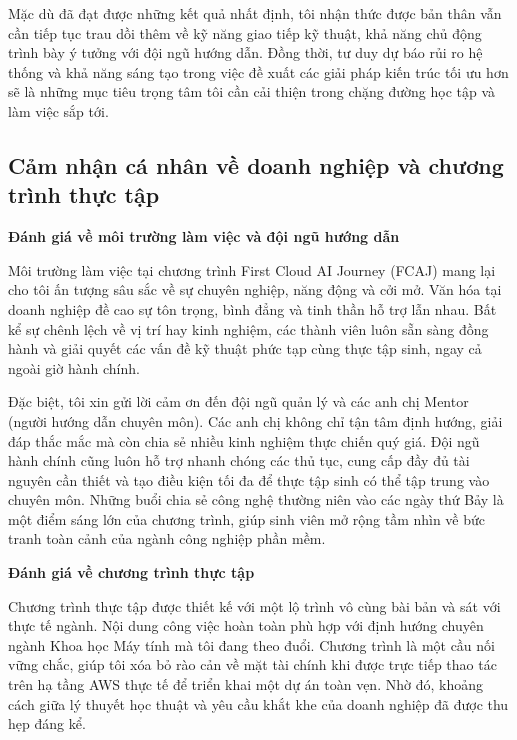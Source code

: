 Mặc dù đã đạt được những kết quả nhất định, tôi nhận thức được bản thân vẫn cần tiếp tục trau dồi thêm về kỹ năng giao tiếp kỹ thuật, khả năng chủ động trình bày ý tưởng với đội ngũ hướng dẫn. Đồng thời, tư duy dự báo rủi ro hệ thống và khả năng sáng tạo trong việc đề xuất các giải pháp kiến trúc tối ưu hơn sẽ là những mục tiêu trọng tâm tôi cần cải thiện trong chặng đường học tập và làm việc sắp tới.


\subsection{Cảm nhận cá nhân về doanh nghiệp và chương trình thực tập}

\vspace{0.2cm}
\noindent\textbf{Đánh giá về môi trường làm việc và đội ngũ hướng dẫn}

Môi trường làm việc tại chương trình First Cloud AI Journey (FCAJ) mang lại cho tôi ấn tượng sâu sắc về sự chuyên nghiệp, năng động và cởi mở. Văn hóa tại doanh nghiệp đề cao sự tôn trọng, bình đẳng và tinh thần hỗ trợ lẫn nhau. Bất kể sự chênh lệch về vị trí hay kinh nghiệm, các thành viên luôn sẵn sàng đồng hành và giải quyết các vấn đề kỹ thuật phức tạp cùng thực tập sinh, ngay cả ngoài giờ hành chính.

Đặc biệt, tôi xin gửi lời cảm ơn đến đội ngũ quản lý và các anh chị Mentor (người hướng dẫn chuyên môn). Các anh chị không chỉ tận tâm định hướng, giải đáp thắc mắc mà còn chia sẻ nhiều kinh nghiệm thực chiến quý giá. Đội ngũ hành chính cũng luôn hỗ trợ nhanh chóng các thủ tục, cung cấp đầy đủ tài nguyên cần thiết và tạo điều kiện tối đa để thực tập sinh có thể tập trung vào chuyên môn. Những buổi chia sẻ công nghệ thường niên vào các ngày thứ Bảy là một điểm sáng lớn của chương trình, giúp sinh viên mở rộng tầm nhìn về bức tranh toàn cảnh của ngành công nghiệp phần mềm.

\vspace{0.2cm}
\noindent\textbf{Đánh giá về chương trình thực tập}

Chương trình thực tập được thiết kế với một lộ trình vô cùng bài bản và sát với thực tế ngành. Nội dung công việc hoàn toàn phù hợp với định hướng chuyên ngành Khoa học Máy tính mà tôi đang theo đuổi. Chương trình là một cầu nối vững chắc, giúp tôi xóa bỏ rào cản về mặt tài chính khi được trực tiếp thao tác trên hạ tầng AWS thực tế để triển khai một dự án toàn vẹn. Nhờ đó, khoảng cách giữa lý thuyết học thuật và yêu cầu khắt khe của doanh nghiệp đã được thu hẹp đáng kể.

